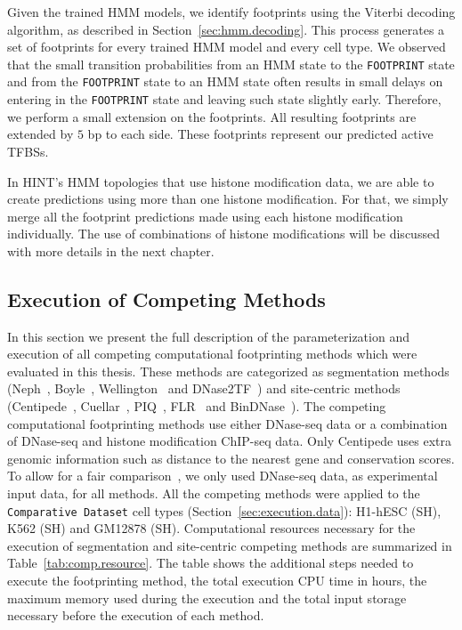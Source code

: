 Given the trained HMM models, we identify footprints using the Viterbi decoding algorithm, as described in Section~\ref{sec:hmm.decoding}. This process generates a set of footprints for every trained HMM model and every cell type. We observed that the small transition probabilities from an HMM state to the {\tt FOOTPRINT} state and from the {\tt FOOTPRINT} state to an HMM state often results in small delays on entering in the {\tt FOOTPRINT} state and leaving such state slightly early. Therefore, we perform a small extension on the footprints. All resulting footprints are extended by $5$ bp to each side. These footprints represent our predicted active TFBSs.

In HINT's HMM topologies that use histone modification data, we are able to create predictions using more than one histone modification. For that, we simply merge all the footprint predictions made using each histone modification individually. The use of combinations of histone modifications will be discussed with more details in the next chapter.

\subsection{Execution of Competing Methods}
\label{sec:competing.methods}

In this section we present the full description of the parameterization and execution of all competing computational footprinting methods which were evaluated in this thesis. These methods are categorized as segmentation methods (Neph~\citep{neph2012a}, Boyle~\citep{boyle2011}, Wellington~\citep{piper2013} and DNase2TF~\citep{sung2014}) and site-centric methods (Centipede~\citep{pique2011}, Cuellar~\citep{cuellar2012}, PIQ~\citep{sherwood2014}, FLR~\citep{yardimci2014} and BinDNase~\citep{kahara2015}). The competing computational footprinting methods use either DNase-seq data or a combination of DNase-seq and histone modification ChIP-seq data. Only Centipede uses extra genomic information such as distance to the nearest gene and conservation scores. To allow for a fair comparison~\citep{rusk2015}, we only used DNase-seq data, as experimental input data, for all methods. All the competing methods were applied to the {\tt Comparative Dataset} cell types (Section~\ref{sec:execution.data}): H1-hESC (SH), K562 (SH) and GM12878 (SH). Computational resources necessary for the execution of segmentation and site-centric competing methods are summarized in Table~\ref{tab:comp.resource}. The table shows the additional steps needed to execute the footprinting method, the total execution CPU time in hours, the maximum memory used during the execution and the total input storage necessary before the execution of each method.

